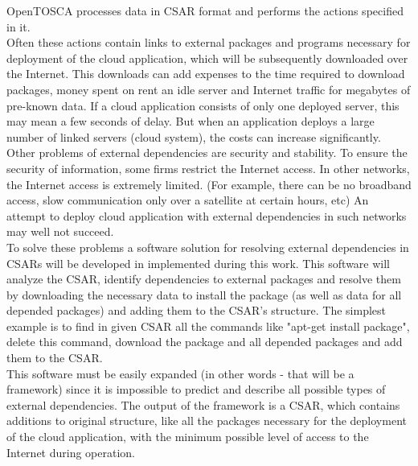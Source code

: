OpenTOSCA processes data in CSAR format and performs the actions specified in it.\\
Often these actions contain links to external packages and programs necessary for deployment of the cloud application, which will be subsequently downloaded over the Internet.
This downloads can add expenses to the time required to download packages, money spent on rent an idle server and Internet traffic for megabytes of pre-known data.
If a cloud application consists of only one deployed server, this may mean a few seconds of delay. 
But when an application deploys a large number of linked servers (cloud system), the costs can increase significantly.\\
Other problems of external dependencies are security and stability.
To ensure the security of information, some firms restrict the Internet access.
In other networks, the Internet access is extremely limited.
(For example, there can be no broadband access, slow communication only over a satellite at certain hours, etc)
An attempt to deploy cloud application with external dependencies in such networks may well not succeed. \\
To solve these problems a software solution for resolving external dependencies in CSARs will be developed in implemented during this work.
This software will analyze the CSAR, identify dependencies to external packages and resolve them by downloading the necessary data to install the package (as well as data for all depended packages) and adding them to the CSAR's structure.
The simplest example is to find in given CSAR all the commands like "apt-get install package", delete this command, download the package and all depended packages and add them to the CSAR.\\
This software must be easily expanded (in other words - that will be a framework) since it is impossible to predict and describe all possible types of external dependencies.
The output of the framework is a CSAR, which contains additions to original structure, like all the packages necessary for the deployment of the cloud application, with the minimum possible level of access to the Internet during operation.
\clearpage 
